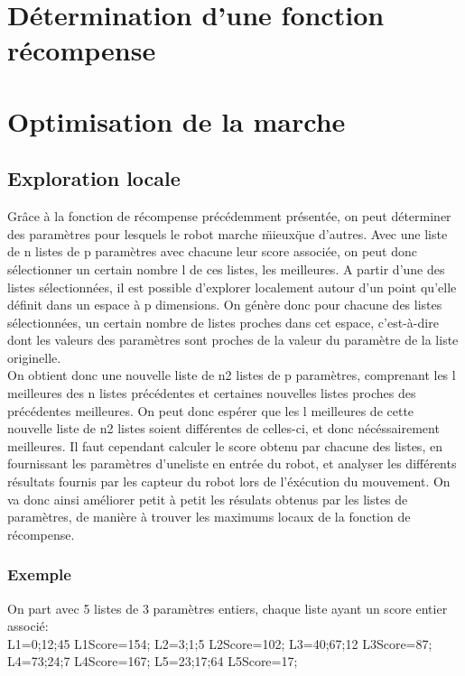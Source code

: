 \documentclass[11pt]{article}
\begin{document}
\section{Détermination d'une fonction récompense}
\section{Optimisation de la marche}
\subsection{Exploration locale}
Grâce à la fonction de récompense précédemment présentée, on peut déterminer des paramètres pour lesquels le robot marche \"mieux\" que d'autres. Avec une liste de n listes de p paramètres avec chacune leur score associée, on peut donc sélectionner un certain nombre l de ces listes, les meilleures. A partir d'une des listes sélectionnées, il est possible d'explorer localement autour d'un point qu'elle définit dans un espace à p dimensions. On génère donc pour chacune des listes sélectionnées, un certain nombre de listes proches dans cet espace, c'est-à-dire dont les valeurs des paramètres sont proches de la valeur du paramètre de la liste originelle.\\
On obtient donc une nouvelle liste de n2 listes de p paramètres, comprenant les l meilleures des n listes précédentes et certaines nouvelles listes proches des précédentes meilleures. On peut donc espérer que les l meilleures de cette nouvelle liste de n2 listes soient différentes de celles-ci, et donc nécéssairement meilleures. Il faut cependant calculer le score obtenu par chacune des listes, en fournissant les paramètres d'uneliste en entrée du robot, et analyser les différents résultats fournis par les capteur du robot lors de l'éxécution du mouvement. On va donc ainsi améliorer petit à petit les résulats obtenus par les listes de paramètres, de manière à trouver les maximums locaux de la fonction de récompense.\\

\subsubsection{Exemple} 
On part avec 5 listes de 3 paramètres entiers, chaque liste ayant un score entier associé:\\
L1={0;12;45}
L1Score=154;
L2={3;1;5}
L2Score=102;
L3={40;67;12}
L3Score=87;
L4={73;24;7}
L4Score=167;
L5={23;17;64}
L5Score=17;\\
\end{document}
